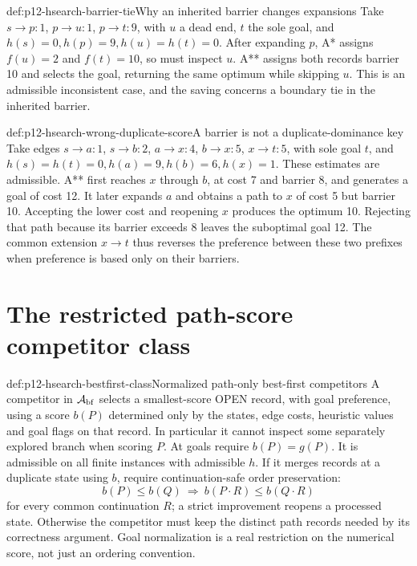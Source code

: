 \begin{hbexample}{def:p12-hsearch-barrier-tie}{Why an inherited barrier changes expansions}
Take \(s\to p:1\), \(p\to u:1\), \(p\to t:9\), with
\(u\) a dead end, \(t\) the sole goal, and
\(h(s)=0,h(p)=9,h(u)=h(t)=0\). After expanding \(p\), A* assigns
\(f(u)=2\) and \(f(t)=10\), so must inspect \(u\).
A** assigns both records barrier 10 and selects the goal, returning the
same optimum while skipping \(u\). This is an admissible inconsistent
case, and the saving concerns a boundary tie in the inherited barrier.
\end{hbexample}

\begin{hbexample}{def:p12-hsearch-wrong-duplicate-score}{A barrier is not a duplicate-dominance key}
Take edges \(s\to a:1\), \(s\to b:2\), \(a\to x:4\),
\(b\to x:5\), \(x\to t:5\), with sole goal \(t\), and
\(h(s)=h(t)=0,h(a)=9,h(b)=6,h(x)=1\). These estimates are
admissible. A** first reaches \(x\) through \(b\), at cost 7
and barrier 8, and generates a goal of cost 12. It later expands \(a\)
and obtains a path to \(x\) of cost 5 but barrier 10. Accepting the
lower cost and reopening \(x\) produces the optimum 10. Rejecting
that path because its barrier exceeds 8 leaves the suboptimal goal 12.
The common extension \(x\to t\) thus reverses the preference between
these two prefixes when preference is based only on their barriers.
\end{hbexample}

\section{The restricted path-score competitor class}

\begin{hbdefinition}{def:p12-hsearch-bestfirst-class}{Normalized path-only best-first competitors}
A competitor in \(\mathcal A_{\rm bf}\) selects a smallest-score
OPEN record, with goal preference, using a score \(b(P)\) determined
only by the states, edge costs, heuristic values and goal flags on that
record. In particular it cannot inspect some separately explored branch
when scoring \(P\). At goals require \(b(P)=g(P)\).
It is admissible on all finite instances with admissible \(h\).
If it merges records at a duplicate state using \(b\), require
continuation-safe order preservation:
\[
 b(P)\le b(Q)\ \Longrightarrow\ b(P\cdot R)\le b(Q\cdot R)
\]
for every common continuation \(R\); a strict improvement reopens
a processed state. Otherwise the competitor must keep the distinct
path records needed by its correctness argument. Goal normalization is
a real restriction on the numerical score, not just an ordering convention.
\end{hbdefinition}

